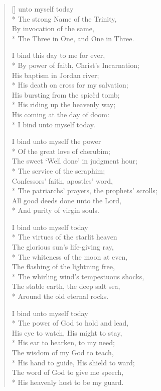 \newHymn


\settowidth{\versewidth}{The Three in One, and One in Three}

\begin{verse}[\versewidth]
 unto myself today\\*
The strong Name of the Trinity,\\
By invocation of the same,\\*
The Three in One, and One in Three.

I bind this day to me for ever,\\*
By power of faith, Christ's Incarnation;\\
His baptism in Jordan river;\\*
His death on cross for my salvation;\\
His bursting from the spicèd tomb;\\*
His riding up the heavenly way;\\
His coming at the day of doom:\\*
I bind unto myself today.

I bind unto myself the power\\*
Of the great love of cherubim;\\
The sweet `Well done' in judgment hour;\\*
The service of the seraphim;\\
Confessors' faith, apostles' word,\\*
The patriarchs' prayers, the prophets' scrolls;\\
All good deeds done unto the Lord,\\*
And purity of virgin souls.

I bind unto myself today\\*
The virtues of the starlit heaven\\
The glorious sun's life-giving ray,\\*
The whiteness of the moon at even,\\
The flashing of the lightning free,\\*
The whirling wind's tempestuous shocks,\\
The stable earth, the deep salt sea,\\*
Around the old eternal rocks.

I bind unto myself today\\*
The power of God to hold and lead,\\
His eye to watch, His might to stay,\\*
His ear to hearken, to my need;\\
The wisdom of my God to teach,\\*
His hand to guide, His shield to ward;\\
The word of God to give me speech,\\*
His heavenly host to be my guard.


\end{verse}
